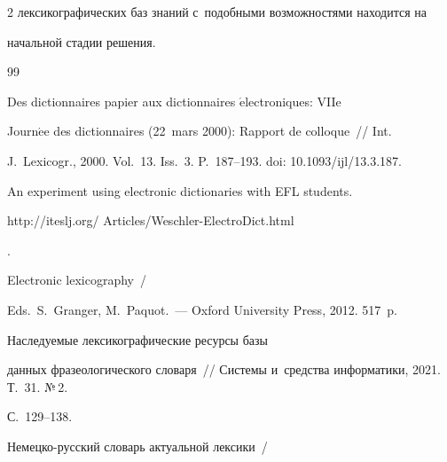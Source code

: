 \begin{multicols}{2}
лексикографических баз знаний с~подобными возможностями находится на 


начальной стадии решения.








\vspace*{-6pt}








{\small\frenchspacing


{\baselineskip=10.7pt




\begin{thebibliography}{99}





\vspace*{-2pt}







 Des dictionnaires papier aux dictionnaires $\acute{\mbox{e}}$lectroniques: VIIe 


Journ$\acute{\mbox{e}}$e des dictionnaires (22~mars 2000): Rapport de colloque~// Int. 


J.~Lexicogr., 2000. Vol.~13. Iss.~3. P.~187--193. doi: 10.1093/ijl/13.3.187.




 An experiment using electronic dictionaries with EFL students. {\sf 


http://iteslj.org/ Articles/Weschler-ElectroDict.html}.




Electronic lexicography~/


Eds.\ S.~Granger, M.~Paquot.~--- Oxford University Press, 2012. 517~p.




 Наследуемые лексикографические ресурсы базы 


данных фразеологического словаря~// Системы и~средства информатики, 2021. Т.~31. №\,2. 


С.~129--138.




Немецко-рус\-ский словарь актуальной лексики~/



\end{thebibliography}}}
\end{multicols}
